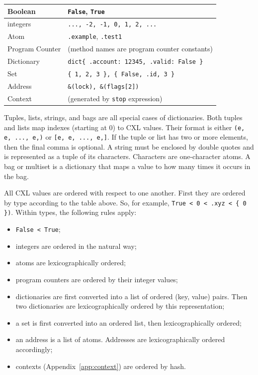 \documentclass{report}
\begin{document}
\vspace{1em}
\begin{tabular}{|l|l|}
\hline
Boolean & \texttt{False}, \texttt{True} \\
\hline
integers & \texttt{..., -2, -1, 0, 1, 2, ...} \\
\hline
Atom & \texttt{.example}, \texttt{.test1} \\
\hline
Program Counter & (method names are program counter constants) \\
\hline
Dictionary & \texttt{dict\{ .account: 12345, .valid: False \} } \\
\hline
Set & \texttt{\{ 1, 2, 3 \}, \{ False, .id, 3 \} } \\
\hline
Address & \texttt{\&(lock), \&(flags[2])} \\
\hline
Context & (generated by \texttt{stop} expression) \\
\hline
\end{tabular}
\vspace{1em}

Tuples, lists, strings, and bags are all special cases of dictionaries.
Both tuples and lists map indexes (starting at 0) to CXL values.
Their format is either \texttt{(e, e, ..., e,)} or
\texttt{[e, e, ..., e,]}.
If the tuple or list has two or more elements, then the final comma
is optional.
A string must be enclosed by double quotes and is represented as
a tuple of its characters.  Characters are one-character atoms.
A bag or multiset is a dictionary that maps a value to how many
times it occurs in the bag.

All CXL values are ordered with respect to one another.  First they
are ordered by type according to the table above.
So, for example, \texttt{\texttt{True} < 0 < .xyz < \{ 0 \})}.
Within types, the following rules apply:

\begin{itemize}
\item \texttt{False < True};
\item integers are ordered in the natural way;
\item atoms are lexicographically ordered;
\item program counters are ordered by their integer values;
\item dictionaries are first converted into a list of ordered (key, value)
pairs.  Then two dictionaries are lexicographically ordered by this
representation;
\item a set is first converted into an ordered list, then lexicographically
ordered;
\item an address is a list of atoms.  Addresses are lexicographically
ordered accordingly;
\item contexts (Appendix~\ref{app:context}) are ordered by hash.
\end{itemize}
\end{document}

